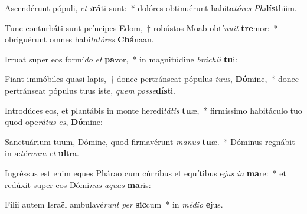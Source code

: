 \item Ascendérunt pópuli, \textit{et} \textit{i}\textbf{rá}ti sunt:~* dolóres obtinuérunt habita\textit{tó}\textit{res} \textit{Phi}\textbf{lís}thiim.
\item Tunc conturbáti sunt príncipes Edom,~† robústos Moab obtí\textit{nu}\textit{it} \textbf{tre}mor:~* obriguérunt omnes habi\textit{ta}\textit{tó}\textit{res} \textbf{Chá}naan.
\item Irruat super eos formí\textit{do} \textit{et} \textbf{pa}vor,~* in magnitúdine \textit{brá}\textit{chi}\textit{i} \textbf{tu}i:
\item Fiant immóbiles quasi lapis,~† donec pertránseat pópulus \textit{tu}\textit{us}, \textbf{Dó}mine,~* donec pertránseat pópulus tuus iste, \textit{quem} \textit{pos}\textit{se}\textbf{dís}ti.
\item Introdúces eos, et plantábis in monte heredi\textit{tá}\textit{tis} \textbf{tu}æ,~* firmíssimo habitáculo tuo quod ope\textit{rá}\textit{tus} \textit{es}, \textbf{Dó}mine:
\item Sanctuárium tuum, Dómine, quod firmavérunt \textit{ma}\textit{nus} \textbf{tu}æ.~* Dóminus regnábit in æ\textit{tér}\textit{num} \textit{et} \textbf{ul}tra.
\item Ingréssus est enim eques Phárao cum cúrribus et equítibus e\textit{jus} \textit{in} \textbf{ma}re:~* et redúxit super eos Dómi\textit{nus} \textit{a}\textit{quas} \textbf{ma}ris:
\item Fílii autem Israël ambulavé\textit{runt} \textit{per} \textbf{sic}cum~* in \textit{mé}\textit{di}\textit{o} \textbf{e}jus.
